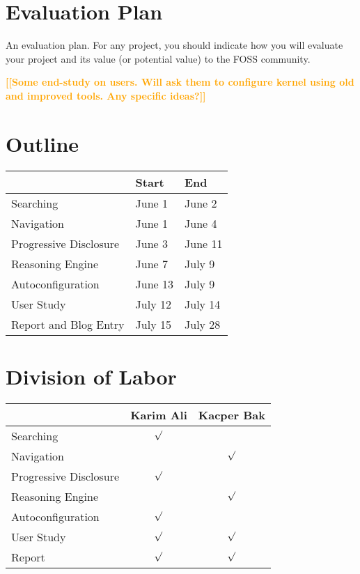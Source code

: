\documentclass{chi2009}
\newcommand{\todo}[1]{\textsf{\textbf{\textcolor{Orange}{[[#1]]}}}}
\begin{document}
\section{Evaluation Plan}

An evaluation plan. For any project, you should indicate how you will evaluate your project and its value (or potential value) to the FOSS community.

\todo{Some end-study on users. Will ask them to configure kernel using old and improved tools. Any specific ideas?}

\section{Outline}

\begin{tabular}{l|l l}
  & Start & End\\ \hline
  Searching & June 1 & June 2\\
  Navigation & June 1 & June 4\\
  Progressive Disclosure & June 3 & June 11\\
  Reasoning Engine & June 7 & July 9\\
  Autoconfiguration & June 13 & July 9\\
  User Study & July 12 & July 14\\
  Report and Blog Entry & July 15 & July 28 
\end{tabular}

\section{Division of Labor}

\begin{tabular}{l|c c}
  & Karim Ali & Kacper Bak\\ \hline
  Searching & $\surd$ &\\
  Navigation & & $\surd$\\
  Progressive Disclosure & $\surd$ &\\
  Reasoning Engine & & $\surd$\\
  Autoconfiguration & $\surd$ &\\
  User Study & $\surd$ & $\surd$\\
  Report & $\surd$ & $\surd$
\end{tabular}



\end{document}
